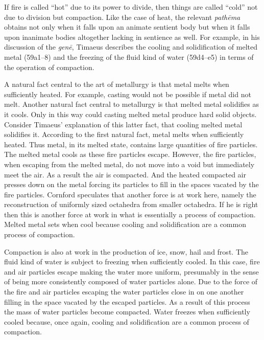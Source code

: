If fire is called ``hot'' due to its power to divide, then things are called ``cold'' not due to division but compaction. Like the case of heat, the relevant \emph{pathēma} obtains not only when it falls upon an animate sentient body but when it falls upon inanimate bodies altogether lacking in sentience as well. For example, in his discussion of the \emph{genē}, Timaeus describes the cooling and solidification of melted metal (59a1--8) and the freezing of the fluid kind of water (59d4--e5) in terms of the operation of compaction. 

A natural fact central to the art of metallurgy is that metal melts when sufficiently heated. For example, casting would not be possible if metal did not melt. Another natural fact central to metallurgy is that melted metal solidifies as it cools. Only in this way could casting melted metal produce hard solid objects. Consider Timaeus' explanation of this latter fact, that cooling melted metal solidifies it. According to the first natural fact, metal melts when sufficiently heated. Thus metal, in its melted state, contains large quantities of fire particles. The melted metal cools as these fire particles escape. However, the fire particles, when escaping from the melted metal, do not move into a void but immediately meet the air. As a result the air is compacted. And the heated compacted air presses down on the metal forcing its particles to fill in the spaces vacated by the fire particles. Cornford speculates that another force is at work here, namely the reconstruction of uniformly sized octahedra from smaller octahedra. If he is right then this is another force at work in what is essentially a process of compaction. Melted metal sets when cool because cooling and solidification are a common process of compaction.

Compaction is also at work in the production of ice, snow, hail and frost. The fluid kind of water is subject to freezing when sufficiently cooled. In this case, fire and air particles escape making the water more uniform, presumably in the sense of being more consistently composed of water particles alone. Due to the force of the fire and air particles escaping the water particles close in on one another filling in the space vacated by the escaped particles. As a result of this process the mass of water particles become compacted. Water freezes when sufficiently cooled because, once again, cooling and solidification are a common process of compaction.

